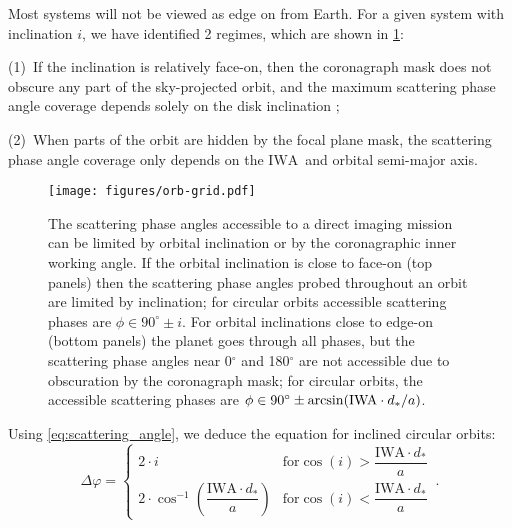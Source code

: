 \documentclass[
    usenatbib,
]{mnras}
\newcommand{\IWA}{\ensuremath{\mathrm{IWA}}}
\begin{document}
Most systems will not be viewed as edge on from Earth.
%
For a given system with inclination $i$, we have identified 2 regimes, which are shown in \cref{fig:orb-grid}:

(1)~If the inclination is relatively face-on, then the coronagraph mask does not obscure any part of the sky-projected orbit, and the maximum scattering phase angle coverage depends solely on the disk inclination ;

(2)~When parts of the orbit  are hidden by the focal plane mask, the scattering phase angle coverage only depends on the \IWA\ and orbital semi-major axis. 

\begin{figure}[htb]
   \centering
   \texttt{[image: figures/orb-grid.pdf]}
   \caption{
        The scattering phase angles accessible to a direct imaging mission can be limited by orbital inclination or by the coronagraphic inner working angle. 
        If the orbital inclination is close to face-on (top panels) then the scattering phase angles probed throughout an orbit are limited by inclination; for circular orbits accessible scattering phases are $\phi \in 90^\circ \pm i$. 
        For orbital inclinations close to edge-on (bottom panels) the planet goes through all phases, but the scattering phase angles near 0$^\circ$ and 180$^\circ$ are not accessible due to obscuration by the coronagraph mask; for circular orbits, the accessible scattering phases are $\phi \in 90^\circ \pm \arcsin({\rm IWA}\cdot d_*/a)$.
    }
    \label{fig:orb-grid}
\end{figure}

Using \cref{eq:scattering_angle}, we deduce the equation for inclined circular orbits: 
\begin{equation}
\label{eq:Delta_phi_max}
    \Delta \varphi = 
    \begin{cases}
        2 \cdot i & \textrm{for} \cos(i) > \dfrac{\mathrm{IWA}\cdot d_* }{a}
  \\ 
        2 \cdot \cos^{-1}\left(\dfrac{\mathrm{IWA}\cdot d_* }{a}\right)  & \textrm{for} \cos(i) < \dfrac{\mathrm{IWA}\cdot d_* }{a}
    \end{cases}\,.
\end{equation}


\end{document}

